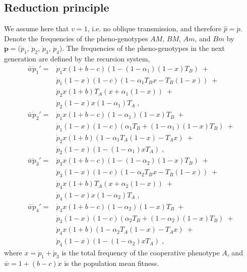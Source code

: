 \documentclass[12pt]{extarticle}
\let\vec\mathbf
\begin{document}
\begin{appendices}
\newpage
\section{Reduction principle} \label{sec:appendixD}

We assume here that $v=1$, i.e. no oblique transmission, and therefore $\hat{p}=\dot{p}$.
Denote the frequencies of the pheno-genotypes $AM$, $BM$, $Am$, and $Bm$ by $\vec{\dot{p}}= (\dot{p}_1$, $\dot{p}_2$, $\dot{p}_3$, $\dot{p}_4)$. 
The frequencies of the pheno-genotypes in the next generation are defined by the recursion system, 
\begin{equation} \label{eq:next_gen_p_1}
  \begin{aligned}
  \bar{w}\dot{p}_1' = 
  & \dot{p}_1 x (1+b-c)(1 - (1-\alpha_1)(1-x)T_B) \;+ \\
  & \dot{p}_1(1-x)(1-c)(1-\alpha_1T_B x - T_B(1-x)) \;+ \\
  & \dot{p}_2 x (1+b)T_A(x + \alpha_1(1-x)) \;+ \\
  & \dot{p}_2(1-x)x(1-\alpha_1)T_A \;,
\\
  \bar{w}\dot{p}_2' = 
  & \dot{p}_1 x (1+b-c)(1-\alpha_1)(1-x)T_B \;+ \\
  & \dot{p}_1(1-x)(1-c)(\alpha_1 T_B + (1-\alpha_1)(1-x)T_B) \;+ \\
  & \dot{p}_2 x (1+b)(1-\alpha_1 T_A(1-x) - T_A x) \;+ \\
& \dot{p}_2(1-x)(1 - (1-\alpha_1) x T_A) \;, 
\\
  \bar{w}\dot{p}_3' =
  & \dot{p}_3 x (1+b-c)(1 - (1-\alpha_2)(1-x)T_B) \;+ \\
  & \dot{p}_3(1-x)(1-c)(1-\alpha_2 T_B x - T_B(1-x)) \;+ \\
  & \dot{p}_4 x (1+b)T_A(x + \alpha_2 (1-x)) \;+ \\
  & \dot{p}_4(1-x) x (1-\alpha_2)T_A \;, 
\\
  \bar{w}\dot{p}_4' =
  & \dot{p}_3 x (1+b-c)(1-\alpha_2)(1-x)T_B \;+ \\
  & \dot{p}_3(1-x)(1-c)(\alpha_2 T_B + (1-\alpha_2)(1-x)T_B) \;+ \\
  & \dot{p}_4 x (1+b)(1-\alpha_2T_A(1-x)-T_A x ) \;+ \\
  & \dot{p}_4(1-x)(1 - (1-\alpha_2) x T_A) \;,
  \end{aligned}
\end{equation}
where $x=\dot{p}_1+\dot{p}_3$ is the total frequency of the cooperative phenotype $A$, and $\bar{w} = 1 + (b-c) x$ is the population mean fitness.%


\end{appendices}
\end{document}
